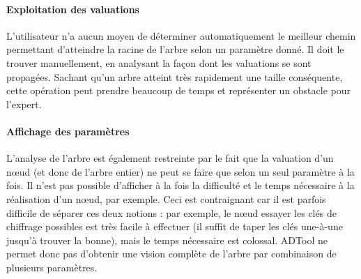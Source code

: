 	 \paragraph{Exploitation des valuations} L'utilisateur n'a aucun moyen de déterminer automatiquement le \og meilleur chemin \fg{} permettant d'atteindre la racine de l'arbre selon un paramètre donné. Il doit le trouver manuellement, en analysant la façon dont les valuations se sont propagées. Sachant qu'un arbre atteint très rapidement une taille conséquente, cette opération peut prendre beaucoup de temps et représenter un obstacle pour l'expert.

	\paragraph{Affichage des paramètres} L'analyse de l'arbre est également restreinte par le fait que la valuation d'un nœud (et donc de l'arbre entier) ne peut se faire que selon un seul paramètre à la fois. Il n'est pas possible d'afficher à la fois la \og difficulté \fg{} et le \og temps nécessaire \fg{} à la réalisation d'un nœud, par exemple. Ceci est contraignant car il est parfois difficile de séparer ces deux notions : par exemple, le nœud \og essayer les clés de chiffrage possibles \fg{} est très facile à effectuer (il suffit de taper les clés une-à-une jusqu'à trouver la bonne), mais le temps nécessaire est colossal. ADTool ne permet donc pas d'obtenir une vision complète de l'arbre par combinaison de plusieurs paramètres.
	 
	 
	 
